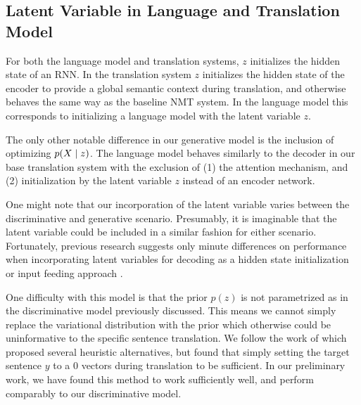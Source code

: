 \subsection{Latent Variable in Language and Translation Model}


For both the language model and translation systems, $z$ initializes the hidden state of an \ac{RNN}. In the translation system $z$  initializes the hidden state of the encoder to provide a global semantic context during translation, and otherwise behaves the same way as the baseline \ac{NMT} system. In the language model this corresponds to initializing a language model with the latent variable $z$. 


The only other notable difference in our generative model is the inclusion of optimizing $p(X \; | \;{z})$. The language model behaves similarly to the decoder in our base translation system with the exclusion of (1) the attention mechanism, and (2) initialization by the latent variable $z$ instead of an encoder network. 

One might note that our incorporation of the latent variable varies between the discriminative and generative scenario. Presumably, it is imaginable that the latent variable could be included in a similar fashion for either scenario. Fortunately, previous research suggests only minute differences on performance when incorporating latent variables for decoding as a hidden state initialization or input feeding approach \cite{bowman2015GeneratingSent}. 




One difficulty with this model is that the prior $p(z)$ is not parametrized as in the discriminative model previously discussed. This means we cannot simply replace the variational distribution with the prior which otherwise could be uninformative to the specific sentence translation. We follow the work of \citet{eikema2018AEVNMT} which proposed several heuristic alternatives, but found that simply setting the target sentence $y$ to a $0$ vectors during translation to be sufficient. In our preliminary work, we have found this method to work sufficiently well, and perform comparably to our discriminative model. 

